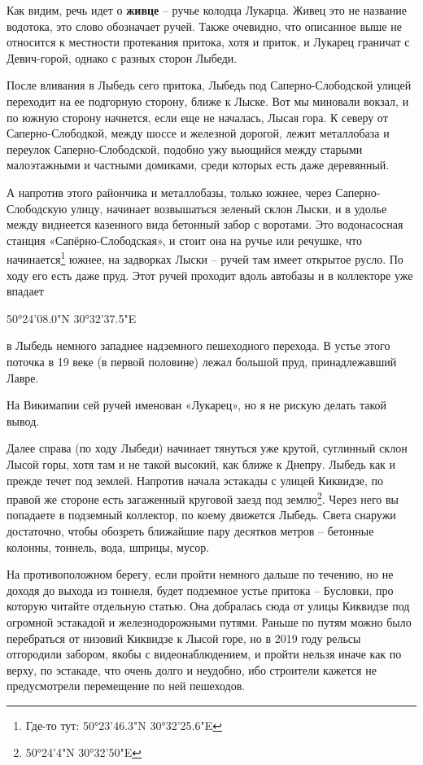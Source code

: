Как видим, речь идет о \textbf{живце} – ручье колодца Лукарца. Живец это не название водотока, это слово обозначает ручей. Также очевидно, что описанное выше не относится к местности протекания притока, хотя и приток, и Лукарец граничат с Девич-горой, однако с разных сторон Лыбеди.

После вливания в Лыбедь сего притока, Лыбедь под Саперно-Слободской улицей переходит на ее подгорную сторону, ближе к Лыске. Вот мы миновали вокзал, и по южную сторону начнется, если еще не началась, Лысая гора. К северу от Саперно-Слободкой, между шоссе и железной дорогой, лежит металлобаза и переулок Саперно-Слободской, подобно ужу вьющийся между старыми малоэтажными и частными домиками, среди которых есть даже деревянный.

А напротив этого райончика и металлобазы, только южнее, через Саперно-Слободскую улицу, начинает возвышаться зеленый склон Лыски, и в удолье между виднеется казенного вида бетонный забор с воротами. Это водонасосная станция «Сапёрно-Слободская», и стоит она на ручье или речушке, что начинается\footnote{Где-то тут: 50°23'46.3"N 30°32'25.6"E} южнее, на задворках Лыски – ручей там имеет открытое русло. По ходу его есть даже пруд. Этот ручей проходит вдоль автобазы и в коллекторе уже впадает

50°24'08.0"N 30°32'37.5"E

в Лыбедь немного западнее надземного пешеходного перехода. В устье этого поточка в 19 веке (в первой половине) лежал большой пруд, принадлежавший Лавре.

На Викимапии сей ручей именован «Лукарец», но я не рискую делать такой вывод.

Далее справа (по ходу Лыбеди) начинает тянуться уже крутой, суглинный склон Лысой горы, хотя там и не такой высокий, как ближе к Днепру. Лыбедь как и прежде течет под землей. Напротив начала эстакады с улицей Киквидзе, по правой же стороне есть загаженный круговой заезд под землю\footnote{50°24'4"N 30°32'50"E}. Через него вы попадаете в подземный коллектор, по коему движется Лыбедь. Света снаружи достаточно, чтобы обозреть ближайшие пару десятков метров – бетонные колонны, тоннель, вода, шприцы, мусор.

На противоположном берегу, если пройти немного дальше по течению, но не доходя до выхода из тоннеля, будет подземное устье притока – Бусловки, про которую читайте отдельную статью. Она добралась сюда от улицы Киквидзе под огромной эстакадой и железнодорожными путями. Раньше по путям можно было перебраться от низовий Киквидзе к Лысой горе, но в 2019 году рельсы отгородили забором, якобы с видеонаблюдением, и пройти нельзя иначе как по верху, по эстакаде, что очень долго и неудобно, ибо строители кажется не предусмотрели перемещение по ней пешеходов.

